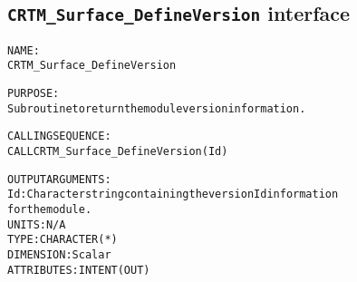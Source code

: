 \subsection{\texttt{CRTM\_Surface\_DefineVersion} interface}
  \label{sec:CRTM_Surface_DefineVersion_interface}
  \begin{alltt}
 
  NAME:
        CRTM_Surface_DefineVersion
 
  PURPOSE:
        Subroutine to return the module version information.
 
  CALLING SEQUENCE:
        CALL CRTM_Surface_DefineVersion( Id )
 
  OUTPUT ARGUMENTS:
        Id:            Character string containing the version Id information
                       for the module.
                       UNITS:      N/A
                       TYPE:       CHARACTER(*)
                       DIMENSION:  Scalar
                       ATTRIBUTES: INTENT(OUT)
 
  \end{alltt}
